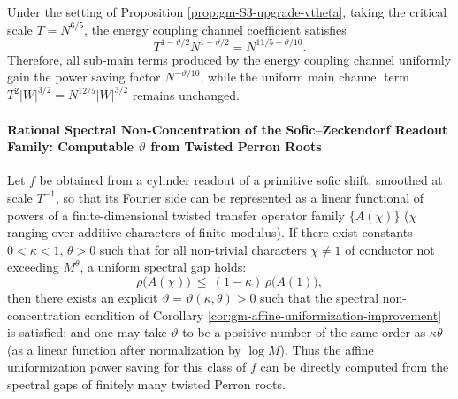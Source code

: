 \begin{corollary}[Verifiable Power Saving in the Energy Window: \texorpdfstring{$N^{-\vartheta/10}$}{N^{-vtheta/10}} Factor at the \texorpdfstring{$T=N^{6/5}$}{T=N^{6/5}} Scale]\label{cor:gm-energy-window-saving}
Under the setting of Proposition \ref{prop:gm-S3-upgrade-vtheta}, taking the critical scale \(T=N^{6/5}\), the energy coupling channel coefficient satisfies
\[
T^{1-\vartheta/2}N^{1+\vartheta/2}=N^{11/5-\vartheta/10}.
\]
Therefore, all sub-main terms produced by the energy coupling channel uniformly gain the power saving factor \(N^{-\vartheta/10}\), while the uniform main channel term \(T^2|W|^{3/2}=N^{12/5}|W|^{3/2}\) remains unchanged.
\end{corollary}

\paragraph{Rational Spectral Non-Concentration of the Sofic--Zeckendorf Readout Family: Computable \texorpdfstring{$\vartheta$}{vtheta} from Twisted Perron Roots}
\begin{theorem}\label{thm:gm-sofic-rational-nonconcentration-vtheta}
Let \(f\) be obtained from a cylinder readout of a primitive sofic shift, smoothed at scale \(T^{-1}\), so that its Fourier side can be represented as a linear functional of powers of a finite-dimensional twisted transfer operator family \(\{A(\chi)\}\) (\(\chi\) ranging over additive characters of finite modulus).
If there exist constants \(0<\kappa<1\), \(\theta>0\) such that for all non-trivial characters \(\chi\ne 1\) of conductor not exceeding \(M^\theta\), a uniform spectral gap holds:
\[
\rho\!\bigl(A(\chi)\bigr)\ \le\ (1-\kappa)\,\rho\!\bigl(A(1)\bigr),
\]
then there exists an explicit \(\vartheta=\vartheta(\kappa,\theta)>0\) such that the spectral non-concentration condition of Corollary \ref{cor:gm-affine-uniformization-improvement} is satisfied; and one may take \(\vartheta\) to be a positive number of the same order as \(\kappa\theta\) (as a linear function after normalization by \(\log M\)).
Thus the affine uniformization power saving for this class of \(f\) can be directly computed from the spectral gaps of finitely many twisted Perron roots.
\end{theorem}

